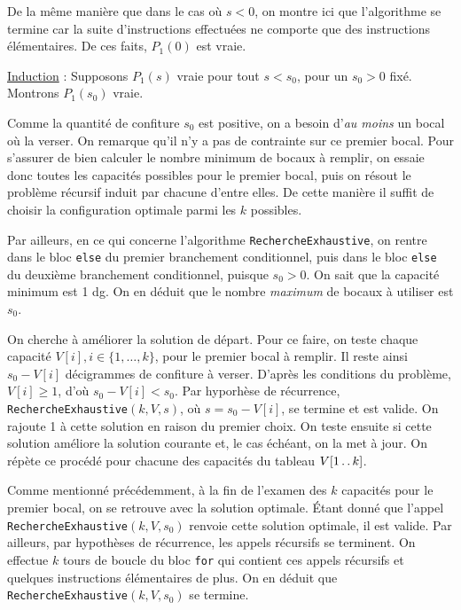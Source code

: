\documentclass[12pt,a4paper]{article}
\newcommand{\tdots}{\mathinner {\ldotp \ldotp}}
\begin{document}
De la m\^eme mani\`ere que dans le cas o\`u $s<0$, on montre ici que l'algorithme se termine car la suite d'instructions effectu\'ees ne comporte que des instructions \'el\'ementaires.
De ces faits, $P_{1}(0)$ est vraie.

\medskip
\underline{Induction} : Supposons \( P_{1}(s) \) vraie pour tout \( s < s_0 \), pour un $s_0>0$ fix\'e. Montrons \( P_{1}(s_0) \) vraie.

Comme la quantit\'e de confiture $s_0$ est positive, on a besoin d'{\itshape au moins} un bocal o\`u la verser. On remarque qu'il n'y a pas de contrainte sur ce premier bocal. Pour s'assurer de bien calculer le nombre minimum de bocaux \`a remplir, on essaie donc toutes les capacit\'es possibles pour le premier bocal, puis on r\'esout le probl\`eme r\'ecursif induit par chacune d'entre elles. De cette mani\`ere il suffit de choisir la configuration optimale parmi les $k$ possibles.

Par ailleurs, en ce qui concerne l'algorithme \texttt{RechercheExhaustive}, on rentre dans le bloc \texttt{else} du premier branchement conditionnel, puis dans le bloc \texttt{else} du deuxi\`eme branchement conditionnel, puisque $s_0 > 0$. On sait que la capacit\'e minimum est 1 \si{dg}. On en d\'eduit que le nombre {\itshape maximum} de bocaux \`a utiliser est $s_0$. 

On cherche \`a am\'eliorer la solution de d\'epart. Pour ce faire, on teste chaque capacit\'e $V[i], i \in \{1, \dotsc, k \}$, pour le premier bocal \`a remplir. Il reste ainsi $s_0-V[i]$ d\'ecigrammes de confiture \`a verser. D'apr\`es les conditions du probl\`eme, $V[i] \geq 1$, d'o\`u $s_0-V[i] < s_0$. Par hyporh\`ese de r\'ecurrence, \texttt{RechercheExhaustive}$(k,V,s)$, o\`u $s=s_0-V[i]$, se termine et est valide. On rajoute 1 \`a cette solution en raison du premier choix. On teste ensuite si cette solution am\'eliore la solution courante et, le cas \'ech\'eant, on la met \`a jour. On r\'ep\`ete ce proc\'ed\'e pour chacune des capacit\'es du tableau $V[1 \tdots k]$. 

Comme mentionn\'e pr\'ec\'edemment, \`a la fin de l'examen des $k$ capacit\'es pour le premier bocal, on se retrouve avec la solution optimale. 
\'Etant donn\'e que l'appel \texttt{RechercheExhaustive}$(k, V, s_0)$ renvoie cette solution optimale, il est valide. 
Par ailleurs, par hypoth\`eses de r\'ecurrence, les appels r\'ecursifs se terminent. On effectue $k$ tours de boucle du bloc \texttt{for} qui contient ces appels r\'ecursifs et quelques instructions \'el\'ementaires de plus.
On en d\'eduit que \texttt{RechercheExhaustive}$(k, V, s_0)$ se termine.
\end{document}
